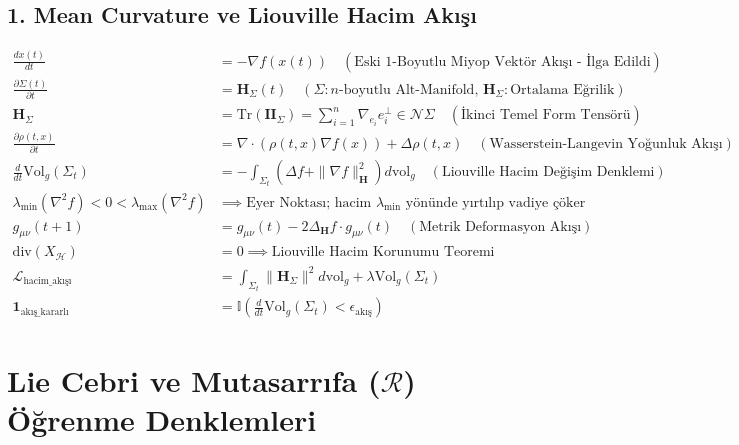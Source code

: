 \documentclass[11pt, a4paper]{article}
\begin{document}
\subsection{1. Mean Curvature ve Liouville Hacim Akışı}
\begin{align}
\frac{dx(t)}{dt} &= -\nabla f(x(t)) \quad (\text{Eski 1-Boyutlu Miyop Vektör Akışı - İlga Edildi}) \\
\frac{\partial \Sigma(t)}{\partial t} &= \mathbf{H}_{\Sigma}(t) \quad (\Sigma: n\text{-boyutlu Alt-Manifold, } \mathbf{H}_{\Sigma}: \text{Ortalama Eğrilik}) \\
\mathbf{H}_{\Sigma} &= \text{Tr}(\mathbf{II}_{\Sigma}) = \sum_{i=1}^n \nabla_{e_i} e_i^{\bot} \in \mathcal{N}\Sigma \quad (\text{İkinci Temel Form Tensörü}) \\
\frac{\partial \rho(t, x)}{\partial t} &= \nabla \cdot (\rho(t, x) \nabla f(x)) + \Delta \rho(t, x) \quad (\text{Wasserstein-Langevin Yoğunluk Akışı}) \\
\frac{d}{dt} \text{Vol}_g(\Sigma_t) &= -\int_{\Sigma_t} \left( \Delta f + \|\nabla f\|_{\mathbf{H}}^2 \right) d\text{vol}_g \quad (\text{Liouville Hacim Değişim Denklemi}) \\
\lambda_{\min}(\nabla^2 f) < 0 < \lambda_{\max}(\nabla^2 f) &\implies \text{Eyer Noktası; hacim } \lambda_{\min} \text{ yönünde yırtılıp vadiye çöker} \\
g_{\mu\nu}(t+1) &= g_{\mu\nu}(t) - 2 \Delta_{\mathbf{H}} f \cdot g_{\mu\nu}(t) \quad (\text{Metrik Deformasyon Akışı}) \\
\text{div}(X_{\mathcal{H}}) &= 0 \implies \text{Liouville Hacim Korunumu Teoremi} \\
\mathcal{L}_{\text{hacim\_akışı}} &= \int_{\Sigma_t} \|\mathbf{H}_{\Sigma}\|^2 d\text{vol}_g + \lambda \text{Vol}_g(\Sigma_t) \\
\mathbf{1}_{\text{akış\_kararlı}} &= \mathbb{I}\left( \frac{d}{dt} \text{Vol}_g(\Sigma_t) < \epsilon_{\text{akış}} \right)
\end{align}

\section{Lie Cebri ve Mutasarrıfa ($\mathcal{R}$) Öğrenme Denklemleri}
\end{document}
